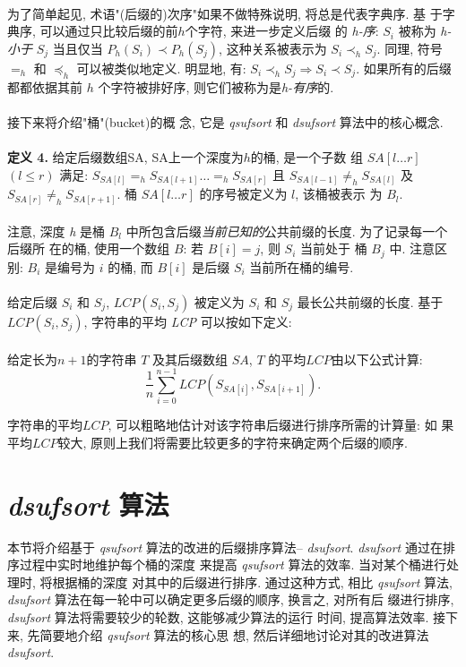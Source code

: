 \documentclass{ws-ijprai}
\begin{document}
\\
为了简单起见, 术语"(后缀的)次序"如果不做特殊说明, 将总是代表字典序. 基
于字典序, 可以通过只比较后缀的前$h$个字符, 来进一步定义后缀
的 \emph{h-序}: $S_i$ 被称为 \emph{h-小于} $S_j$ 当且仅当 $P_h(S_i)
\prec P_h(S_j)$, 这种关系被表示为 $S_i \prec_h S_j$.  同理, 符号
$=_h$ 和 $\preceq_h$ 可以被类似地定义. 明显地, 有: $S_i \prec_h S_j
\Longrightarrow S_i \prec S_j$. 如果所有的后缀都都依据其前
$h$ 个字符被排好序, 则它们被称为是\emph{h-有序}的.\\
\\
接下来将介绍"桶"(bucket)的概
念, 它是 \emph{qsufsort} 和 \emph{dsufsort} 算法中的核心概念.\\
\\
\textbf{定义 4.} 给定后缀数组SA, SA上一个深度为$h$的桶, 是一个子数
组 $SA[l \dots r]$ $(l \leq r)$ 满足: $S_{SA[l]} =_h S_{SA[l+1]}\dots
=_h S_{SA[r]}$ 且 $S_{SA[l-1]} \neq_h S_{SA[l]}$ 及 $S_{SA[r]} \neq_h
S_{SA[r+1]}$. 桶 $SA[l \dots r]$ 的序号被定义为 $l$, 该桶被表示
为 $B_l$.\\
\\
注意, 深度 \emph{h} 是桶
$B_l$ 中所包含后缀\emph{当前已知的}公共前缀的长度. 为了记录每一个后缀所
在的桶, 使用一个数组 $B$: 若 $B[i] = j$, 则 $S_i$ 当前处于
桶 $B_j$ 中. 注意区别: $B_i$ 是编号为 $i$ 的桶, 而 $B[i]$ 是后缀
$S_i$ 当前所在桶的编号.\\
\\
给定后缀 $S_i$ 和 $S_j$, $LCP(S_i, S_j)$ 被定义为 $S_i$ 和
$S_j$ 最长公共前缀的长度. 基于 $LCP(S_i,
S_j)$, 字符串的平均 \emph{LCP} 可以按如下定义:\\
\\
给定长为$n+1$的字符串 $T$ 及其后缀数组 $SA$, $T$
的平均$LCP$由以下公式计算:\\

\begin{equation}
\frac{1}{n}\sum_{i=0}^{n-1}LCP(S_{SA[i]},S_{SA[i+1]}).
\end{equation}

字符串的平均$LCP$, 可以粗略地估计对该字符串后缀进行排序所需的计算量: 如
果平均$LCP$较大, 原则上我们将需要比较更多的字符来确定两个后缀的顺序.

\section{ \emph{dsufsort} 算法}

本节将介绍基于 \emph{qsufsort} 算法的改进的后缀排序算法--
\emph{dsufsort}. \emph{dsufsort} 通过在排序过程中实时地维护每个桶的深度
来提高 \emph{qsufsort} 算法的效率. 当对某个桶进行处理时, 将根据桶的深度
对其中的后缀进行排序. 通过这种方式, 相比 \emph{qsufsort} 算法,
\emph{dsufsort} 算法在每一轮中可以确定更多后缀的顺序, 换言之, 对所有后
缀进行排序, \emph{dsufsort} 算法将需要较少的轮数, 这能够减少算法的运行
时间, 提高算法效率. 接下来, 先简要地介绍 \emph{qsufsort} 算法的核心思
想, 然后详细地讨论对其的改进算法 \emph{dsufsort}.
\end{document}
